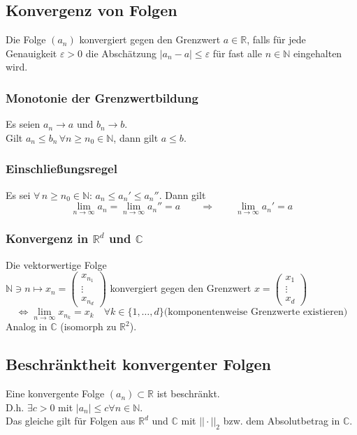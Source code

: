 \documentclass[10pt,a4paper^, twocolumn]{article}
\renewcommand{\epsilon}{\varepsilon} %
\newcommand{\R}{\mathbb{R}}
\newcommand{\N}{\mathbb{N}}
\begin{document}
\subsection{Konvergenz von Folgen}
	Die Folge $(a_n)$ konvergiert gegen den Grenzwert $a \in \R$, falls für
	jede Genauigkeit $\epsilon > 0$ die Abschätzung $|a_n - a| \leq \epsilon$ für fast
	alle $n \in \N$ eingehalten wird.
\subsubsection{Monotonie der Grenzwertbildung}
	Es seien $a_n \to a$ und $b_n \to b$.\\
	Gilt $a_n \leq b_n \, \forall n \geq n_0 \in \N$, dann gilt $ a \leq b$.
\subsubsection{Einschließungsregel}
	Es sei $\forall \, n \geq n_0 \in \N : \, a_n \leq a_n' \leq a_n''$.
	Dann gilt 
	$$\lim_{n \to \infty} a_n = \lim_{n \to \infty} a_n'' = a 
	\qquad \Rightarrow  \qquad \lim_{n \to \infty} a_n' = a$$
\subsubsection{Konvergenz in $\R^d$ und $\mathbb{C}$}
	Die vektorwertige Folge\\
	$\N \ni n \mapsto x_n = 
		\begin{pmatrix}
			x_{n_1}\\
			\vdots \\
			x_{n_d}
		\end{pmatrix}$
	konvergiert gegen den Grenzwert $
		x = \begin{pmatrix}
			x_{1}\\
			\vdots \\
			x_{d}
		\end{pmatrix}$\\
	$$\Leftrightarrow 
		\lim_{n \to \infty} x_{n_k} = x_k 
		\quad \forall k \in \{1, \dots, d \} 
		\text{(komponentenweise Grenzwerte existieren)}$$
	Analog in $\mathbb{C}$ (isomorph zu $\R^2$).
\subsection{Beschränktheit konvergenter Folgen}
	Eine konvergente Folge $(a_n) \subset \R$ ist beschränkt.\\
	D.h. $\exists c > 0 $ mit $|a_n| \leq c \forall n \in \N$.\\
	Das gleiche gilt für Folgen aus  $\R^d$ und $\mathbb{C}$ mit $||\cdot||_2$
	bzw. dem Absolutbetrag in $\mathbb{C}$.
\end{document}
